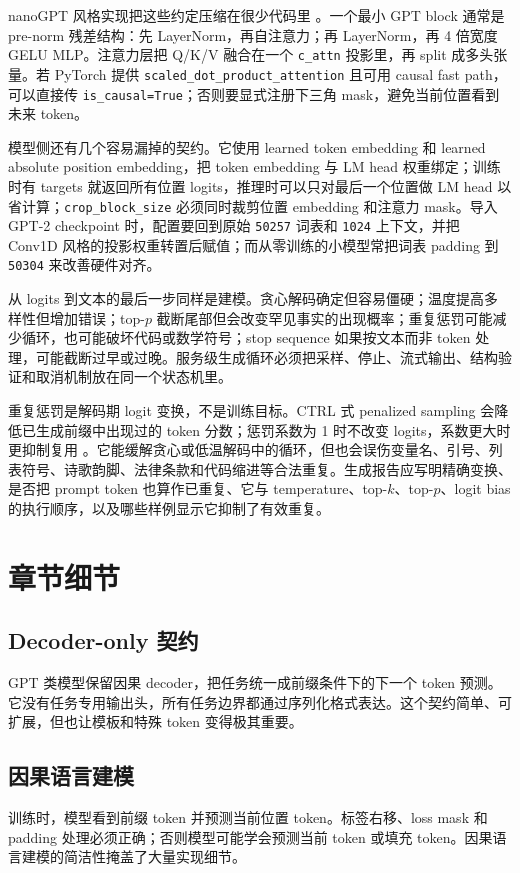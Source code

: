 \documentclass[UTF8,zihao=-4,openany]{ctexbook}
\begin{document}
nanoGPT 风格实现把这些约定压缩在很少代码里 \cite{karpathy2022nanogpt}。一个最小 GPT block 通常是 pre-norm 残差结构：先 LayerNorm，再自注意力；再 LayerNorm，再 4 倍宽度 GELU MLP。注意力层把 Q/K/V 融合在一个 \texttt{c\_attn} 投影里，再 split 成多头张量。若 PyTorch 提供 \texttt{scaled\_dot\_product\_attention} 且可用 causal fast path，可以直接传 \texttt{is\_causal=True}；否则要显式注册下三角 mask，避免当前位置看到未来 token。

模型侧还有几个容易漏掉的契约。它使用 learned token embedding 和 learned absolute position embedding，把 token embedding 与 LM head 权重绑定；训练时有 targets 就返回所有位置 logits，推理时可以只对最后一个位置做 LM head 以省计算；\texttt{crop\_block\_size} 必须同时裁剪位置 embedding 和注意力 mask。导入 GPT-2 checkpoint 时，配置要回到原始 \texttt{50257} 词表和 \texttt{1024} 上下文，并把 Conv1D 风格的投影权重转置后赋值；而从零训练的小模型常把词表 padding 到 \texttt{50304} 来改善硬件对齐。

从 logits 到文本的最后一步同样是建模。贪心解码确定但容易僵硬；温度提高多样性但增加错误；top-$p$ 截断尾部但会改变罕见事实的出现概率；重复惩罚可能减少循环，也可能破坏代码或数学符号；stop sequence 如果按文本而非 token 处理，可能截断过早或过晚。服务级生成循环必须把采样、停止、流式输出、结构验证和取消机制放在同一个状态机里。

重复惩罚是解码期 logit 变换，不是训练目标。CTRL 式 penalized sampling 会降低已生成前缀中出现过的 token 分数；惩罚系数为 1 时不改变 logits，系数更大时更抑制复用 \cite{keskar2019ctrl}。它能缓解贪心或低温解码中的循环，但也会误伤变量名、引号、列表符号、诗歌韵脚、法律条款和代码缩进等合法重复。生成报告应写明精确变换、是否把 prompt token 也算作已重复、它与 temperature、top-$k$、top-$p$、logit bias 的执行顺序，以及哪些样例显示它抑制了有效重复。

\section{章节细节}
\subsection{Decoder-only 契约}
GPT 类模型保留因果 decoder，把任务统一成前缀条件下的下一个 token 预测。它没有任务专用输出头，所有任务边界都通过序列化格式表达。这个契约简单、可扩展，但也让模板和特殊 token 变得极其重要。

\subsection{因果语言建模}
训练时，模型看到前缀 token 并预测当前位置 token。标签右移、loss mask 和 padding 处理必须正确；否则模型可能学会预测当前 token 或填充 token。因果语言建模的简洁性掩盖了大量实现细节。
\end{document}
